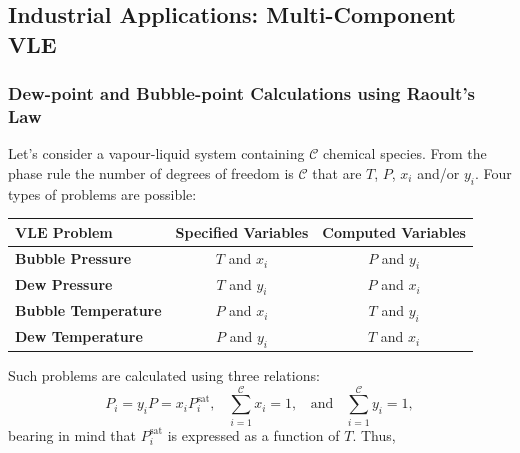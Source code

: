 \documentclass[12pts,a4paper,amsmath,amssymb,floatfix]{article}%
\newcommand{\summation}[3][error]{\sum\limits_{#2}^{#3}#1}
\begin{document}
  
\subsection{Industrial Applications: Multi-Component VLE}

\subsubsection{Dew-point and Bubble-point Calculations using Raoult’s Law }

Let's consider a vapour-liquid system containing $\mathcal{C}$ chemical species. From the phase rule the number of degrees of freedom is $\mathcal{C}$ that are $T$, $P$, $x_{i}$ and/or $y_{i}$. Four types of problems are possible:
\begin{center}
   \begin{tabular}{|l c c|}
      \hline 
      $\mathbf{VLE}$ {\bf Problem} & {\bf Specified Variables} &  {\bf Computed Variables} \\  
      \hline
          {\bf Bubble Pressure}        &  $T$ and $x_{i}$           &   $P$ and $y_{i}$          \\
          {\bf Dew Pressure}           &  $T$ and $y_{i}$           &   $P$ and $x_{i}$          \\
          {\bf Bubble Temperature}     &  $P$ and $x_{i}$           &   $T$ and $y_{i}$          \\
          {\bf Dew Temperature}        &  $P$ and $y_{i}$           &   $T$ and $x_{i}$          \\     
      \hline
   \end{tabular}
\end{center}
Such problems are calculated using three relations:
\begin{displaymath}
    P_{i} = y_{i}P = x_{i}P_{i}^{\text{sat}}, \;\;\; \summation[x_{i}]{i=1}{\mathcal{C}} = 1, \;\;\text{ and }\;\; \summation[y_{i}]{i=1}{\mathcal{C}} = 1,
\end{displaymath}
bearing in mind that $P_{i}^{\text{sat}}$ is expressed as a function of $T$. Thus,
\end{document}
